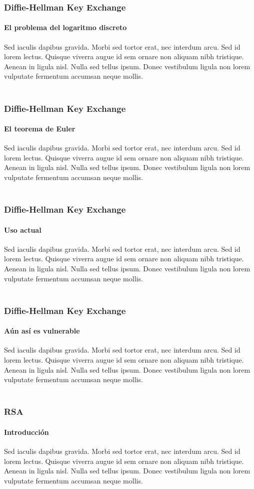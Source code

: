 \documentclass[spanish, mexico]{beamer}
\begin{document}
	\begin{frame}
		\frametitle{Diffie-Hellman Key Exchange}
		\framesubtitle{El problema del logaritmo discreto}
		Sed iaculis dapibus gravida. Morbi sed tortor erat, nec interdum arcu. Sed id lorem lectus. Quisque viverra augue id sem ornare non aliquam nibh tristique. Aenean in ligula nisl. Nulla sed tellus ipsum. Donec vestibulum ligula non lorem vulputate fermentum accumsan neque mollis.\\~\\
	\end{frame}

	\begin{frame}
		\frametitle{Diffie-Hellman Key Exchange}
		\framesubtitle{El teorema de Euler}
		Sed iaculis dapibus gravida. Morbi sed tortor erat, nec interdum arcu. Sed id lorem lectus. Quisque viverra augue id sem ornare non aliquam nibh tristique. Aenean in ligula nisl. Nulla sed tellus ipsum. Donec vestibulum ligula non lorem vulputate fermentum accumsan neque mollis.\\~\\
	\end{frame}

	\begin{frame}
		\frametitle{Diffie-Hellman Key Exchange}
		\framesubtitle{Uso actual}
		Sed iaculis dapibus gravida. Morbi sed tortor erat, nec interdum arcu. Sed id lorem lectus. Quisque viverra augue id sem ornare non aliquam nibh tristique. Aenean in ligula nisl. Nulla sed tellus ipsum. Donec vestibulum ligula non lorem vulputate fermentum accumsan neque mollis.\\~\\
	\end{frame}

	\begin{frame}
		\frametitle{Diffie-Hellman Key Exchange}
		\framesubtitle{Aún así es vulnerable}
		Sed iaculis dapibus gravida. Morbi sed tortor erat, nec interdum arcu. Sed id lorem lectus. Quisque viverra augue id sem ornare non aliquam nibh tristique. Aenean in ligula nisl. Nulla sed tellus ipsum. Donec vestibulum ligula non lorem vulputate fermentum accumsan neque mollis.\\~\\
	\end{frame}

	\begin{frame}
		\frametitle{RSA}
		\framesubtitle{Introducción}
		Sed iaculis dapibus gravida. Morbi sed tortor erat, nec interdum arcu. Sed id lorem lectus. Quisque viverra augue id sem ornare non aliquam nibh tristique. Aenean in ligula nisl. Nulla sed tellus ipsum. Donec vestibulum ligula non lorem vulputate fermentum accumsan neque mollis.\\~\\
	\end{frame}
\end{document}
